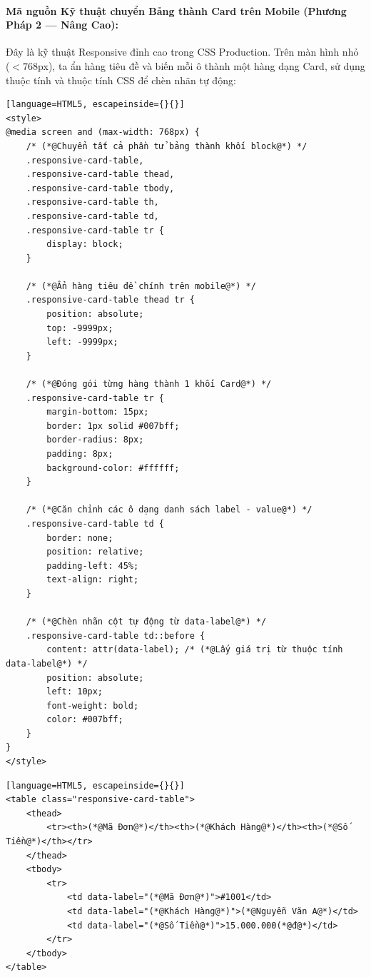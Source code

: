 \paragraph{Mã nguồn Kỹ thuật chuyển Bảng thành Card trên Mobile (Phương Pháp 2 --- Nâng Cao):}
Đây là kỹ thuật Responsive đỉnh cao trong CSS Production. Trên màn hình nhỏ ($<768$px), ta ẩn hàng tiêu đề  và biến mỗi ô  thành một hàng dạng Card, sử dụng thuộc tính  và thuộc tính CSS  để chèn nhãn tự động:

\begin{codeWindow}
\begin{lstlisting}[language=HTML5, escapeinside={}{}]
<style>
@media screen and (max-width: 768px) {
    /* (*@Chuyển tất cả phần tử bảng thành khối block@*) */
    .responsive-card-table, 
    .responsive-card-table thead, 
    .responsive-card-table tbody, 
    .responsive-card-table th, 
    .responsive-card-table td, 
    .responsive-card-table tr {
        display: block;
    }

    /* (*@Ẩn hàng tiêu đề chính trên mobile@*) */
    .responsive-card-table thead tr {
        position: absolute;
        top: -9999px;
        left: -9999px;
    }

    /* (*@Đóng gói từng hàng thành 1 khối Card@*) */
    .responsive-card-table tr {
        margin-bottom: 15px;
        border: 1px solid #007bff;
        border-radius: 8px;
        padding: 8px;
        background-color: #ffffff;
    }

    /* (*@Căn chỉnh các ô dạng danh sách label - value@*) */
    .responsive-card-table td {
        border: none;
        position: relative;
        padding-left: 45%;
        text-align: right;
    }

    /* (*@Chèn nhãn cột tự động từ data-label@*) */
    .responsive-card-table td::before {
        content: attr(data-label); /* (*@Lấy giá trị từ thuộc tính data-label@*) */
        position: absolute;
        left: 10px;
        font-weight: bold;
        color: #007bff;
    }
}
</style>
\end{lstlisting}
\end{codeWindow}

\begin{codeWindow}
\begin{lstlisting}[language=HTML5, escapeinside={}{}]
<table class="responsive-card-table">
    <thead>
        <tr><th>(*@Mã Đơn@*)</th><th>(*@Khách Hàng@*)</th><th>(*@Số Tiền@*)</th></tr>
    </thead>
    <tbody>
        <tr>
            <td data-label="(*@Mã Đơn@*)">#1001</td>
            <td data-label="(*@Khách Hàng@*)">(*@Nguyễn Văn A@*)</td>
            <td data-label="(*@Số Tiền@*)">15.000.000(*@đ@*)</td>
        </tr>
    </tbody>
</table>
\end{lstlisting}
\end{codeWindow}

